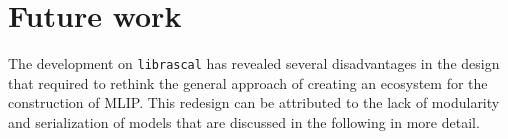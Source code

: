 



\section{Future work}
The development on \texttt{librascal} has revealed several disadvantages in the design that required to rethink the general approach of creating an ecosystem for the construction of MLIP.
This redesign can be attributed to the lack of modularity and serialization of models that are discussed in the following in more detail. 

